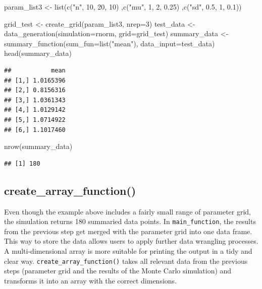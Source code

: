\documentclass[11pt,a4paper]{article}
\newenvironment{Shaded}{\begin{snugshade}}{\end{snugshade}}
\newcommand{\AttributeTok}[1]{\textcolor[rgb]{0.77,0.63,0.00}{#1}}
\newcommand{\DecValTok}[1]{\textcolor[rgb]{0.00,0.00,0.81}{#1}}
\newcommand{\FloatTok}[1]{\textcolor[rgb]{0.00,0.00,0.81}{#1}}
\newcommand{\FunctionTok}[1]{\textcolor[rgb]{0.00,0.00,0.00}{#1}}
\newcommand{\NormalTok}[1]{#1}
\newcommand{\OtherTok}[1]{\textcolor[rgb]{0.56,0.35,0.01}{#1}}
\newcommand{\StringTok}[1]{\textcolor[rgb]{0.31,0.60,0.02}{#1}}
\begin{document}
\begin{Shaded}
\begin{Highlighting}[]
\NormalTok{param\_list3 }\OtherTok{\textless{}{-}} \FunctionTok{list}\NormalTok{(}\FunctionTok{c}\NormalTok{(}\StringTok{"n"}\NormalTok{, }\DecValTok{10}\NormalTok{, }\DecValTok{20}\NormalTok{, }\DecValTok{10}\NormalTok{)}
\NormalTok{                    ,}\FunctionTok{c}\NormalTok{(}\StringTok{"mu"}\NormalTok{, }\DecValTok{1}\NormalTok{, }\DecValTok{2}\NormalTok{, }\FloatTok{0.25}\NormalTok{)}
\NormalTok{                    ,}\FunctionTok{c}\NormalTok{(}\StringTok{"sd"}\NormalTok{, }\FloatTok{0.5}\NormalTok{, }\DecValTok{1}\NormalTok{, }\FloatTok{0.1}\NormalTok{))}

\NormalTok{grid\_test }\OtherTok{\textless{}{-}} \FunctionTok{create\_grid}\NormalTok{(param\_list3, }\AttributeTok{nrep=}\DecValTok{3}\NormalTok{)}
\NormalTok{test\_data }\OtherTok{\textless{}{-}} \FunctionTok{data\_generation}\NormalTok{(}\AttributeTok{simulation=}\NormalTok{rnorm, }\AttributeTok{grid=}\NormalTok{grid\_test)}
\NormalTok{summary\_data }\OtherTok{\textless{}{-}} \FunctionTok{summary\_function}\NormalTok{(}\AttributeTok{sum\_fun=}\FunctionTok{list}\NormalTok{(}\StringTok{"mean"}\NormalTok{), }\AttributeTok{data\_input=}\NormalTok{test\_data)}
\FunctionTok{head}\NormalTok{(summary\_data)}
\end{Highlighting}
\end{Shaded}

\begin{verbatim}
##           mean
## [1,] 1.0165396
## [2,] 0.8156316
## [3,] 1.0361343
## [4,] 1.0129142
## [5,] 1.0714922
## [6,] 1.1017460
\end{verbatim}

\begin{Shaded}
\begin{Highlighting}[]
\FunctionTok{nrow}\NormalTok{(summary\_data)}
\end{Highlighting}
\end{Shaded}

\begin{verbatim}
## [1] 180
\end{verbatim}

\hypertarget{create_array_function}{%
\subsection{create\_array\_function()}\label{create_array_function}}

Even though the example above includes a fairly small range of parameter
grid, the simulation returns 180 summaried data points. In
\texttt{main\_function}, the results from the previous step get merged
with the parameter grid into one data frame. This way to store the data
allows users to apply further data wrangling processes. A
multi-dimensional array is more suitable for printing the output in a
tidy and clear way. \texttt{create\_array\_function()} takes all
relevant data from the previous steps (parameter grid and the results of
the Monte Carlo simulation) and transforms it into an array with the
correct dimensions.
\end{document}
